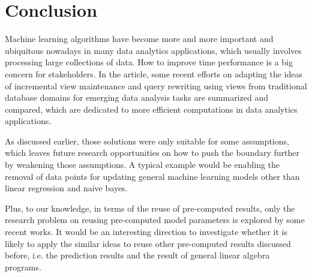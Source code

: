 \section{Conclusion}
Machine learning algorithms have become more and more important and ubiquitous nowadays in many data analytics applications, which usually involves processing large collections of data. How to improve time performance is a big concern for stakeholders. In the article, some recent efforts on adapting the ideas of incremental view maintenance and query rewriting using views from traditional database domains for emerging data analysis tasks are summarized and compared, which are dedicated to more efficient computations in data analytics applications. 

As discussed earlier, those solutions were only suitable for some assumptions, which leaves future research opportunities on how to push the boundary further by weakening those assumptions. A typical example would be enabling the removal of data points for updating general machine learning models other than linear regression and naive bayes.

Plus, to our knowledge, in terms of the reuse of pre-computed results, only the research problem on reusing pre-computed model parameters is explored by some recent works. It would be an interesting direction to investigate whether it is likely to apply the similar ideas to reuse other pre-computed results discussed before, i.e. the prediction results and the result of general linear algebra programs.